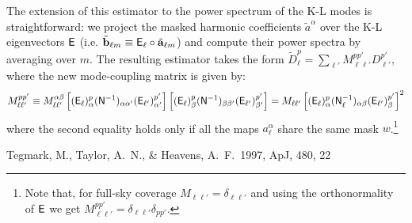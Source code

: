 \documentclass[a4paper,10pt]{article}
\begin{document}
  The extension of this estimator to the power spectrum of the K-L modes is straightforward: we project the masked harmonic coefficients $\tilde{a}^\alpha$ over the K-L eigenvectors ${\sf E}$ (i.e. $\tilde{\bf b}_{\ell m}\equiv {\sf E}_\ell\circ\tilde{\bf a}_{\ell m}$) and compute their power spectra by averaging over $m$. The resulting estimator takes the form $\tilde{D}^p_\ell=\sum_{\ell'}M_{\ell\ell'}^{pp'}D^{p'}_{\ell'}$, where the new mode-coupling matrix is given by:
  \begin{equation}
    M^{pp'}_{\ell\ell'}\equiv M^{\alpha\beta}_{\ell\ell'}\left[({\sf E}_\ell)^p_\alpha({\sf N}^{-1})_{\alpha\alpha'}({\sf E}_{\ell'})^{p'}_{\alpha'}\right]\left[({\sf E}_\ell)^p_\beta({\sf N}^{-1})_{\beta\beta'}({\sf E}_{\ell'})^{p'}_{\beta'}\right]
    =M_{\ell\ell'}\left[({\sf E}_\ell)^p_\alpha({\sf N}^{-1}_\ell)_{\alpha\beta}({\sf E}_{\ell'})^{p'}_\beta\right]^2
  \end{equation}
  where the second equality holds only if all the maps $a^\alpha_\ell$ share the same mask $w$.\footnote{Note that, for full-sky coverage $M_{\ell\ell'}=\delta_{\ell\ell'}$ and using the orthonormality of ${\sf E}$ we get $M^{pp'}_{\ell\ell'}=\delta_{\ell\ell'}\delta_{pp'}$.}


  
\begin{thebibliography}{12pt}
   Tegmark, M., Taylor, A.~N., \& Heavens, A.~F.\ 1997, ApJ, 480, 22
\end{thebibliography}
\end{document}
